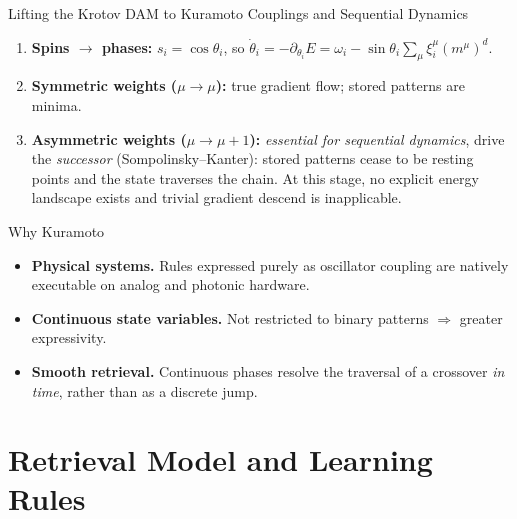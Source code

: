 \documentclass[aspectratio=169]{beamer}
\newcommand{\xxi}{\xi}
\newcommand{\thetavar}{\theta}
\newcommand{\mvar}{m}
\begin{document}
\begin{frame}{Lifting the Krotov DAM to Kuramoto Couplings and Sequential Dynamics}
  \begin{enumerate}
    \item \textbf{Spins $\to$ phases:} $s_i = \cos\thetavar_i$, so
      $\dot\thetavar_i = -\partial_{\thetavar_i} E
       = \omega_i - \sin\thetavar_i \sum_\mu \xxi_i^{\mu}(\mvar^\mu)^d$.
    \item \textbf{Symmetric weights ($\mu \to \mu$):} true gradient flow; stored
      patterns are minima.
    \item \textbf{Asymmetric weights ($\mu \to \mu+1$):} \emph{essential for sequential dynamics}, drive the \emph{successor}
      (Sompolinsky--Kanter): stored patterns cease to be resting points and
      the state traverses the chain. At this stage, no explicit energy landscape exists and trivial gradient descend is inapplicable.
  \end{enumerate}
  \begin{block}{Why Kuramoto}
    \small
    \begin{itemize}
      \item \textbf{Physical systems.} Rules expressed purely as oscillator
        coupling are natively executable on analog and photonic hardware.
      \item \textbf{Continuous state variables.} Not restricted to binary
        patterns $\Rightarrow$ greater expressivity.
      \item \textbf{Smooth retrieval.} Continuous phases resolve the traversal of a
        crossover \emph{in time}, rather than as a discrete jump.
    \end{itemize}
  \end{block}
\end{frame}


\section[Model]{Retrieval Model and Learning Rules}
\end{document}
